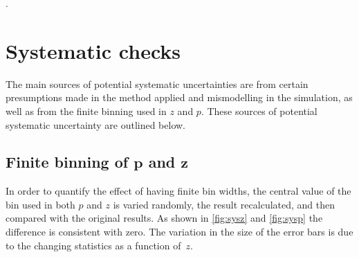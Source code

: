 
. %


\clearpage
 
\section{Systematic checks}
\label{sec:sys}

The main sources of potential systematic uncertainties are from certain presumptions made in the method applied and mismodelling in the simulation, as well as from the finite binning used in $z$ and $p$. These sources of potential systematic uncertainty are outlined below.

\subsection[{Finite binning of $p$ and $z$}]{Finite binning of $\mathbold{p}$ and $\mathbold{z}$}
In order to quantify the effect of having finite bin widths, the central value of the bin used in both $p$ and $z$ is varied randomly, the result recalculated, and then compared with the original results. As shown in \autoref{fig:sysz} and \ref{fig:sysp} the difference is consistent with zero. The variation in the size of the error bars is due to the changing statistics as a function of~$z$.


